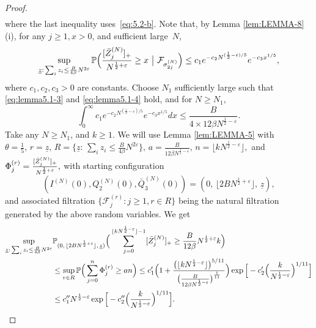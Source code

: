 \documentclass[10pt,a4paper]{amsart}
\begin{document}
\begin{proof}
\begin{equation}
\begin{split}
    \end{split}
\end{equation}
where the last inequality uses~\eqref{eq:5.2-b}.
Note that, by Lemma \ref{lem:LEMMA-8} (i), for any $j\geq 1, x>0$, and sufficient large~$N$,
\begin{equation}\label{eq:lemma5.1-4}
    \sup_{\underline{z}: \, \sum_iz_i \leq \frac{B}{4\beta}N^{2\varepsilon}} \mathbb{P}\Big(\frac{[\Bar{Z}^{(N)}_j]_+}{N^{\frac{1}{2}+\varepsilon}}\geq x\ \big|\ \mathcal{F}_{\sigma^{(N)}_{2j}}\Big)\leq c_1e^{-c_2N^{(\frac{1}{2}-\varepsilon)/5}}e^{-c_3x^{1/5}},
\end{equation}
where $c_1,c_2,c_3>0$ are constants.
Choose $N_1$ sufficiently large such that \eqref{eq:lemma5.1-3} and \eqref{eq:lemma5.1-4} hold, and for $N\geq N_1$,
$$\int_0^{\infty}c_1e^{-c_2N^{(\frac{1}{2}-\varepsilon)/5}}e^{-c_3x^{1/5}}dx\leq \frac{B}{4\times 12\beta N^{\frac{1}{2}-\varepsilon}}.$$
Take any $N\geq N_1$, and $k\geq 1$. 
We will use Lemma \ref{lem:LEMMA-5}  with
$\theta =\frac{1}{5}, \, r=\underline{z}, \, R = \{\underline{z}: \, \sum_iz_i \leq \frac{B}{4\beta}N^{2\varepsilon}\}, \, a=\frac{B}{12\beta N^{\frac{1}{2}-\varepsilon}}, \, n= \lfloor kN^{\frac{1}{2}-\varepsilon}\rfloor,$
and 
$\Phi^{(r)}_j=\frac{[\Bar{Z}^{(N)}_j]_+}{N^{\frac{1}{2}+\varepsilon}},$
with starting configuration $$(I^{(N)}(0), Q_2^{(N)}(0), \bar{Q}^{(N)}_3(0)) = (0, \, \lfloor 2BN^{\frac{1}{2}+\varepsilon} \rfloor, \,\underline{z}),$$ and associated filtration $\big\{\mathcal{F}^{(r)}_j : j\geq 1, r \in R\big\}$ being the natural filtration generated by the above random variables.
We get
\begin{align}\label{eq:lemma5.1-5}
   \sup_{\underline{z}: \, \sum_iz_i \leq \frac{B}{4\beta}N^{2\varepsilon}}&\mathbb{P}_{(0, \, \lfloor 2BN^{\frac{1}{2}+\varepsilon} \rfloor, \,\underline{z})}\Big(\sum_{j=0}^{\lfloor kN^{\frac{1}{2}-\varepsilon}\rfloor-1}[\Bar{Z}^{(N)}_j]_+\geq \frac{B}{12\beta}N^{\frac{1}{2}+\varepsilon}k\Big)\nonumber\\
    &\le \sup_{r\in R}\mathbb{P}\Big(\sum_{j=0}^{n}\Phi^{(r)}_j\geq an\Big)
    \leq  c'_1\Big(1+\frac{\big(\lfloor kN^{\frac{1}{2}-\varepsilon}\rfloor\big)^{5/11}}{\big(\frac{B}{12\beta N^{\frac{1}{2}-\varepsilon}}\big)^{\frac{1}{11}}}\Big)\exp \Big[-c'_2\Big(\frac{k}{N^{\frac{1}{2}-\varepsilon}}\Big)^{1/11}\Big]\\\nonumber
    &\leq  c_1''N^{\frac{1}{2}-\varepsilon}\exp\Big[-c''_2\Big(\frac{k}{N^{\frac{1}{2}-\varepsilon}}\Big)^{1/11}\Big].\nonumber
\end{align}

\end{proof}
\end{document}
